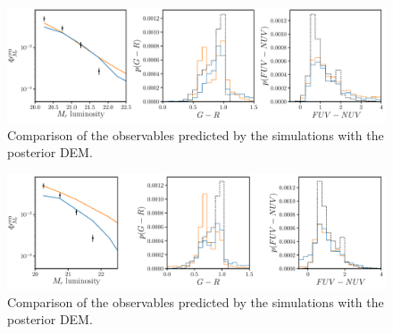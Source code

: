 \begin{figure}
\begin{center}
    \includegraphics[width=\textwidth]{figs/abc_observables_1d.pdf}
    \caption{Comparison of the observables predicted by the simulations with
    the posterior DEM.}
\label{fig:dem}
\end{center}
\end{figure}

\begin{figure}
\begin{center}
    \includegraphics[width=\textwidth]{figs/abc_tnorm_observables_1d.pdf}
    \caption{Comparison of the observables predicted by the simulations with
    the posterior DEM.}
\label{fig:dem}
\end{center}
\end{figure}
